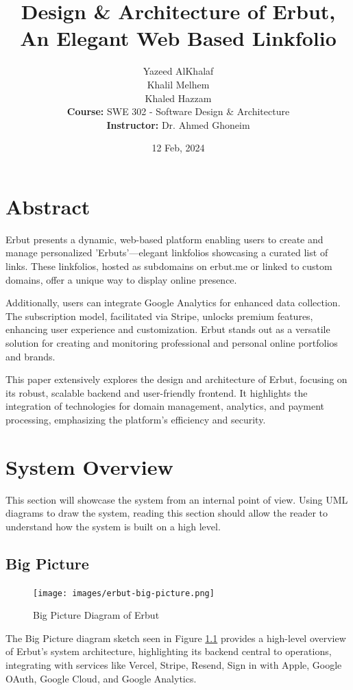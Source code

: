 \documentclass[a4paper]{report}
\title{Design \& Architecture of Erbut, An Elegant Web Based Linkfolio}
\author{
    Yazeed AlKhalaf \\
    Khalil Melhem \\
    Khaled Hazzam \\
    \textbf{Course:} SWE 302 - Software Design \& Architecture \\
    \textbf{Instructor:} Dr. Ahmed Ghoneim
}
\date{12 Feb, 2024}
\begin{document}
\maketitle

\newpage

\chapter*{Abstract}

Erbut presents a dynamic, web-based platform enabling users to create and manage personalized 'Erbuts'—elegant linkfolios showcasing a curated list of links. These linkfolios, hosted as subdomains on erbut.me or linked to custom domains, offer a unique way to display online presence.

Additionally, users can integrate Google Analytics for enhanced data collection. The subscription model, facilitated via Stripe, unlocks premium features, enhancing user experience and customization. Erbut stands out as a versatile solution for creating and monitoring professional and personal online portfolios and brands.

This paper extensively explores the design and architecture of Erbut, focusing on its robust, scalable backend and user-friendly frontend. It highlights the integration of technologies for domain management, analytics, and payment processing, emphasizing the platform's efficiency and security.

\newpage

\chapter{System Overview}

This section will showcase the system from an internal point of view. Using UML diagrams to draw the system, reading this section should allow the reader to understand how the system is built on a high level.

\section{Big Picture}

\begin{figure}[h!]
    \centering
    \texttt{[image: images/erbut-big-picture.png]}
    \caption{Big Picture Diagram of Erbut}
    \label{fig:bigpicture}
\end{figure}

The Big Picture diagram sketch seen in Figure \ref{fig:bigpicture} provides a high-level overview of Erbut’s system architecture, highlighting its backend central to operations, integrating with services like Vercel, Stripe, Resend, Sign in with Apple, Google OAuth, Google Cloud, and Google Analytics.
\end{document}
